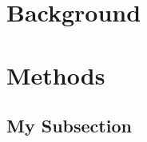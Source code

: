 \documentclass[twocolumn]{bmcart}%
\begin{document}
\begin{frontmatter}
\begin{fmbox}
\end{fmbox}%


\begin{abstractbox}

\begin{abstract} %


\end{abstract}


\begin{keyword}
\end{keyword}

\end{abstractbox}
%

\end{frontmatter}

\section*{Background}

\section*{Methods}

\subsection*{My Subsection}
\end{document}
